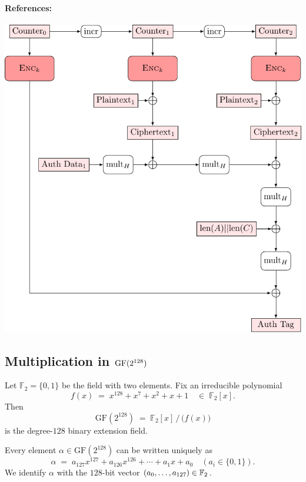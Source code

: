 
\paragraph{References:} 
\cite{McGrewViega2004gcm}
\begin{center}
\includegraphics[scale=.955]{tikz/GCM_encryption}
\end{center}


\subsection{Multiplication in $\operatorname{GF}(2^{128})$}
\begin{definition}
	Let \(\mathbb F_2 = \{0,1\}\) be the field with two elements.  Fix an irreducible polynomial
	\[
	f(x) \;=\; x^{128} + x^7 + x^2 + x + 1 
	\quad\in\; \mathbb F_2[x].
	\]
	Then
	\[
	\mathrm{GF}(2^{128}) \;=\; \mathbb F_2[x] \,\big/\,\bigl(f(x)\bigr)
	\]
	is the degree-\(128\) binary extension field.
\end{definition}
\begin{remark}
Every element \(\alpha\in\mathrm{GF}(2^{128})\) can be written uniquely as \[
\alpha \;=\; a_{127}x^{127} + a_{126}x^{126} + \cdots + a_1 x + a_0
\quad(a_i\in\{0,1\}).
\] We identify \(\alpha\) with the \(128\)-bit vector \((a_{0},\dots,a_{127})\in\mathbb{F}_2\).
\end{remark}

